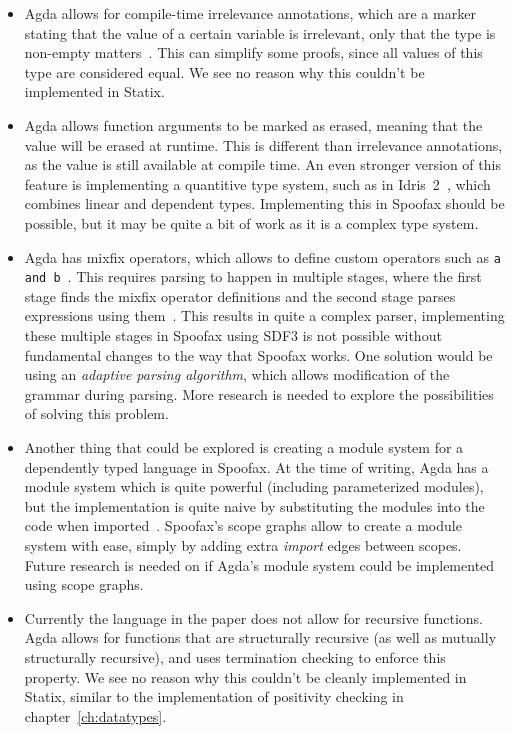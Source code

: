 \begin{itemize}
	\item Agda allows for compile-time irrelevance annotations, which are a marker stating that the value of a certain variable is irrelevant, only that the type is non-empty matters~\cite[Irrelevance]{agda}. This can simplify some proofs, since all values of this type are considered equal. We see no reason why this couldn't be implemented in Statix.
	\item Agda allows function arguments to be marked as erased, meaning that the value will be erased at runtime. This is different than irrelevance annotations, as the value is still available at compile time. An even stronger version of this feature is implementing a quantitive type system, such as in Idris~2~\cite{idris2}, which combines linear and dependent types. Implementing this in Spoofax should be possible, but it may be quite a bit of work as it is a complex type system.
	\item Agda has mixfix operators, which allows to define custom operators such as \verb|a and b|~\cite[Mixfix Operators]{agda}. This requires parsing to happen in multiple stages, where the first stage finds the mixfix operator definitions and the second stage parses expressions using them~\cite{mixfix}. This results in quite a complex parser, implementing these multiple stages in Spoofax using SDF3 is not possible without fundamental changes to the way that Spoofax works. One solution would be using an \emph{adaptive parsing algorithm}, which allows modification of the grammar during parsing. More research is needed to explore the possibilities of solving this problem.
	\item Another thing that could be explored is creating a module system for a dependently typed language in Spoofax. At the time of writing, Agda has a module system which is quite powerful (including parameterized modules), but the implementation is quite naive by substituting the modules into the code when imported~\cite[Modules]{agda}. Spoofax's scope graphs allow to create a module system with ease, simply by adding extra \emph{import} edges between scopes. Future research is needed on if Agda's module system could be implemented using scope graphs.
	\item Currently the language in the paper does not allow for recursive functions. Agda allows for functions that are structurally recursive (as well as mutually structurally recursive), and uses termination checking to enforce this property. We see no reason why this couldn't be cleanly implemented in Statix, similar to the implementation of positivity checking in chapter~\ref{ch:datatypes}.
\end{itemize}

